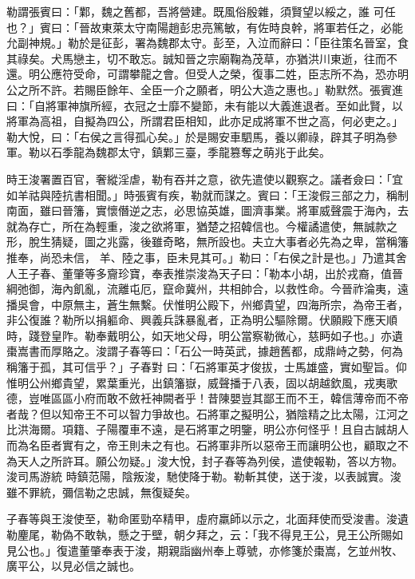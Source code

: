 \begin{pinyinscope}
 勒謂張賓曰：「鄴，魏之舊都，吾將營建。既風俗殷雜，須賢望以綏之，誰
 可任也？」賓曰：「晉故東萊太守南陽趙彭忠亮篤敏，有佐時良幹，將軍若任之，必能允副神規。」勒於是征彭，署為魏郡太守。彭至，入泣而辭曰：「臣往策名晉室，食其祿矣。犬馬戀主，切不敢忘。誠知晉之宗廟鞠為茂草，亦猶洪川東逝，往而不還。明公應符受命，可謂攀龍之會。但受人之榮，復事二姓，臣志所不為，恐亦明公之所不許。若賜臣餘年、全臣一介之願者，明公大造之惠也。」勒默然。張賓進曰：「自將軍神旗所經，衣冠之士靡不變節，未有能以大義進退者。至如此賢，以將軍為高祖，自擬為四公，所謂君臣相知，此亦足成將軍不世之高，何必吏之。」
 勒大悅，曰：「右侯之言得孤心矣。」於是賜安車駟馬，養以卿祿，辟其子明為參軍。勒以石季龍為魏郡太守，鎮鄴三臺，季龍篡奪之萌兆于此矣。



 時王浚署置百官，奢縱淫虐，勒有吞并之意，欲先遣使以觀察之。議者僉曰：「宜如羊祜與陸抗書相聞。」時張賓有疾，勒就而謀之。賓曰：「王浚假三部之力，稱制南面，雖曰晉籓，實懷僭逆之志，必思協英雄，圖濟事業。將軍威聲震于海內，去就為存亡，所在為輕重，浚之欲將軍，猶楚之招韓信也。今權譎遣使，無誠款之形，脫生猜疑，圖之兆露，後雖奇略，無所設也。夫立大事者必先為之卑，當稱籓推奉，尚恐未信，
 羊、陸之事，臣未見其可。」勒曰：「右侯之計是也。」乃遣其舍人王子春、董肇等多齎珍寶，奉表推崇浚為天子曰：「勒本小胡，出於戎裔，值晉綱弛御，海內飢亂，流離屯厄，竄命冀州，共相帥合，以救性命。今晉祚淪夷，遠播吳會，中原無主，蒼生無繫。伏惟明公殿下，州鄉貴望，四海所宗，為帝王者，非公復誰？勒所以捐軀命、興義兵誅暴亂者，正為明公驅除爾。伏願殿下應天順時，踐登皇阼。勒奉戴明公，如天地父母，明公當察勒微心，慈眄如子也。」亦遺棗嵩書而厚賂之。浚謂子春等曰：「石公一時英武，據趙舊都，成鼎峙之勢，何為稱籓于孤，其可信乎？」子春對
 曰：「石將軍英才俊拔，士馬雄盛，實如聖旨。仰惟明公州鄉貴望，累葉重光，出鎮籓嶽，威聲播于八表，固以胡越欽風，戎夷歌德，豈唯區區小府而敢不斂衽神闕者乎！昔陳嬰豈其鄙王而不王，韓信薄帝而不帝者哉？但以知帝王不可以智力爭故也。石將軍之擬明公，猶陰精之比太陽，江河之比洪海爾。項籍、子陽覆車不遠，是石將軍之明鑒，明公亦何怪乎！且自古誠胡人而為名臣者實有之，帝王則未之有也。石將軍非所以惡帝王而讓明公也，顧取之不為天人之所許耳。願公勿疑。」浚大悅，封子春等為列侯，遣使報勒，答以方物。浚司馬游統
 時鎮范陽，陰叛浚，馳使降于勒。勒斬其使，送于浚，以表誠實。浚雖不罪統，彌信勒之忠誠，無復疑矣。



 子春等與王浚使至，勒命匿勁卒精甲，虛府羸師以示之，北面拜使而受浚書。浚遺勒麈尾，勒偽不敢執，懸之于壁，朝夕拜之，云：「我不得見王公，見王公所賜如見公也。」復遣董肇奉表于浚，期親詣幽州奉上尊號，亦修箋於棗嵩，乞並州牧、廣平公，以見必信之誠也。




\end{pinyinscope}
